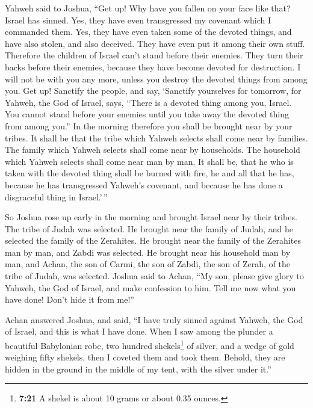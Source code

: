  Yahweh said to Joshua, ``Get up! Why have you fallen on
your face like that?  Israel has sinned. Yes, they have
even transgressed my covenant which I commanded them. Yes, they have
even taken some of the devoted things, and have also stolen, and also
deceived. They have even put it among their own stuff. 
Therefore the children of Israel can't stand before their enemies. They
turn their backs before their enemies, because they have become devoted
for destruction. I will not be with you any more, unless you destroy the
devoted things from among you.  Get up! Sanctify the
people, and say, `Sanctify yourselves for tomorrow, for Yahweh, the God
of Israel, says, ``There is a devoted thing among you, Israel. You
cannot stand before your enemies until you take away the devoted thing
from among you.''  In the morning therefore you shall be
brought near by your tribes. It shall be that the tribe which Yahweh
selects shall come near by families. The family which Yahweh selects
shall come near by households. The household which Yahweh selects shall
come near man by man.  It shall be, that he who is taken
with the devoted thing shall be burned with fire, he and all that he
has, because he has transgressed Yahweh's covenant, and because he has
done a disgraceful thing in Israel.'\,''

 So Joshua rose up early in the morning and brought
Israel near by their tribes. The tribe of Judah was selected.
 He brought near the family of Judah, and he selected the
family of the Zerahites. He brought near the family of the Zerahites man
by man, and Zabdi was selected.  He brought near his
household man by man, and Achan, the son of Carmi, the son of Zabdi, the
son of Zerah, of the tribe of Judah, was selected. 
Joshua said to Achan, ``My son, please give glory to Yahweh, the God of
Israel, and make confession to him. Tell me now what you have done!
Don't hide it from me!''

 Achan answered Joshua, and said, ``I have truly sinned
against Yahweh, the God of Israel, and this is what I have done.
 When I saw among the plunder a beautiful Babylonian
robe, two hundred shekels\footnote{\textbf{7:21} A shekel is about 10
  grams or about 0.35 ounces.} of silver, and a wedge of gold weighing
fifty shekels, then I coveted them and took them. Behold, they are
hidden in the ground in the middle of my tent, with the silver under
it.''


